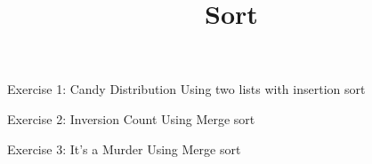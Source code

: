 \documentclass{beamer}
\title{Sort}
\begin{document}
\frame{
  \titlepage
}

\begin{frame}{Exercise 1: Candy Distribution}
  Using two lists with insertion sort
  
\end{frame}

\begin{frame}{Exercise 2: Inversion Count}
  Using Merge sort
  
\end{frame}

\begin{frame}{Exercise 3: It's a Murder}
  Using Merge sort
  
\end{frame}
\end{document}
